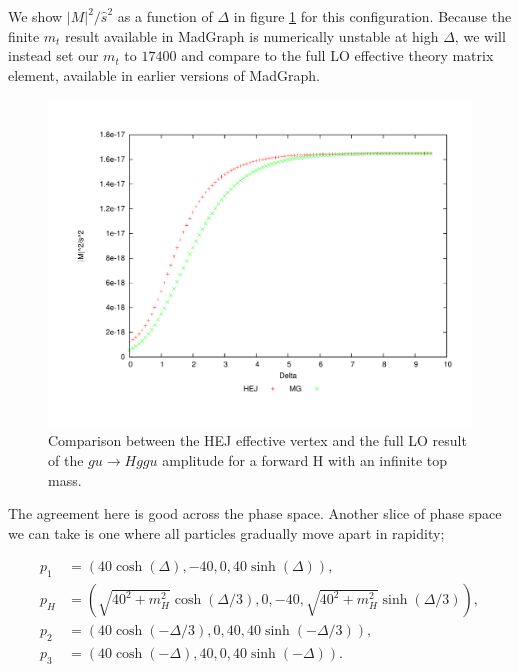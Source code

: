 We show $|M|^2/\hat{s}^2$ as a function of $\Delta$ in figure \ref{fig:ug_for} for this configuration. Because the finite $m_t$ result available in MadGraph is numerically unstable at high $\Delta$, we will instead set our $m_t$ to $17400$ and compare to the full LO effective theory matrix element, available in earlier versions of MadGraph. 

\begin{figure}[H]
\centering
\includegraphics[scale=0.5]{Images/ug_nextfor.pdf}
\caption{Comparison between the HEJ effective vertex and the full LO result of the $gu \to Hggu$ amplitude for a forward H with an infinite top mass.}
\label{fig:ug_for} 
\end{figure}

The agreement here is good across the phase space. Another slice of phase space we can take is one where all particles gradually move apart in rapidity;

\begin{subequations}
\begin{align}
p_1 &= (40 \cosh(\Delta),-40,0,40 \sinh(\Delta)), \\
p_H &= (\sqrt{40^2+m_H^2} \cosh(\Delta/3), 0,-40,\sqrt{40^2+m_H^2}  \sinh(\Delta/3)), \\
p_2 &= (40 \cosh(-\Delta/3),0,40,40 \sinh(-\Delta/3)), \\
p_3 &= (40 \cosh(-\Delta),40,0,40 \sinh(-\Delta)).
\end{align}
\end{subequations}


